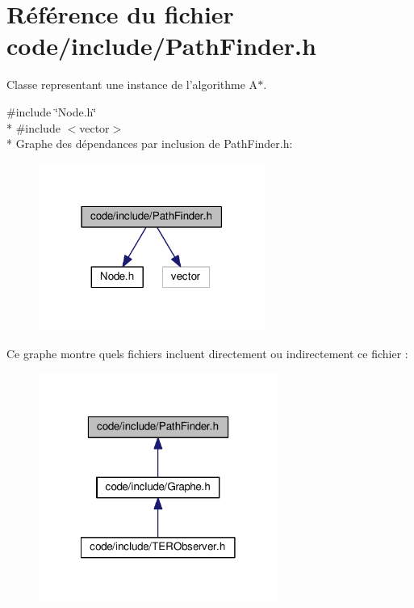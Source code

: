 \section{Référence du fichier code/include/\-Path\-Finder.h}
\label{_path_finder_8h}


Classe representant une instance de l'algorithme A$\ast$.  


{\ttfamily \#include \char`\"{}Node.\-h\char`\"{}}\\*
{\ttfamily \#include $<$vector$>$}\\*
Graphe des dépendances par inclusion de Path\-Finder.\-h\-:
\nopagebreak
\begin{figure}[H]
\begin{center}
\leavevmode
\includegraphics[width=210pt]{_path_finder_8h__incl}
\end{center}
\end{figure}
Ce graphe montre quels fichiers incluent directement ou indirectement ce fichier \-:
\nopagebreak
\begin{figure}[H]
\begin{center}
\leavevmode
\includegraphics[width=222pt]{_path_finder_8h__dep__incl}
\end{center}
\end{figure}
